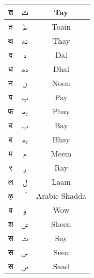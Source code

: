 \begin{longtable}[c]{|c|c|c|}
\textsanskrit{त}               & \texturdu{ت}            & Tay                         \\ \hline
\textsanskrit{त}               & \texturdu{ط}            & Toain                       \\ \hline
\textsanskrit{थ}               & \texturdu{تھ‍}          & Thay                        \\ \hline
\textsanskrit{द}               & \texturdu{د}            & Dal                         \\ \hline
\textsanskrit{ध}               & \texturdu{دھ‍}          & Dhal                        \\ \hline
\textsanskrit{न}               & \texturdu{ن}            & Noon                        \\ \hline
\textsanskrit{प}               & \texturdu{پ}            & Pay                         \\ \hline
\textsanskrit{फ}               & \texturdu{پھ‍}          & Phay                        \\ \hline
\textsanskrit{ब}               & \texturdu{ب}            & Bay                         \\ \hline
\textsanskrit{ब}               & \texturdu{بھ}           & Bhay                        \\ \hline
\textsanskrit{म}               & \texturdu{م}            & Meem                        \\ \hline
\textsanskrit{र}               & \texturdu{ر}            & Ray                         \\ \hline
\textsanskrit{ल}               & \texturdu{ل}            & Laam                        \\ \hline
\textsanskrit{ऴ}               & \texturdu{ّ}            & Arabic Shadda               \\ \hline
\textsanskrit{व}               & \texturdu{و}            & Wow                         \\ \hline
\textsanskrit{श}               & \texturdu{ش}            & Sheen                       \\ \hline
\textsanskrit{स}               & \texturdu{ث}            & Say                         \\ \hline
\textsanskrit{स}               & \texturdu{س}            & Seen                        \\ \hline
\textsanskrit{स}               & \texturdu{ص}            & Saad                        \\ \hline

\end{longtable}
